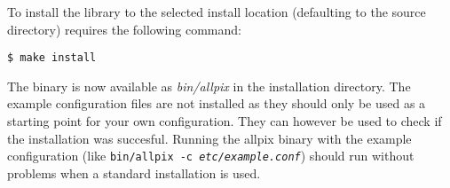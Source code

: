 To install the library to the selected install location (defaulting to the source directory) requires the following command:
\begin{verbatim}
$ make install
\end{verbatim}

The binary is now available as \textit{bin/allpix} in the installation directory. The example configuration files are not installed as they should only be used as a starting point for your own configuration. They can however be used to check if the installation was succesful. Running the allpix binary with the example configuration (like \texttt{bin/allpix -c \textit{etc/example.conf}}) should run without problems when a standard installation is used.
